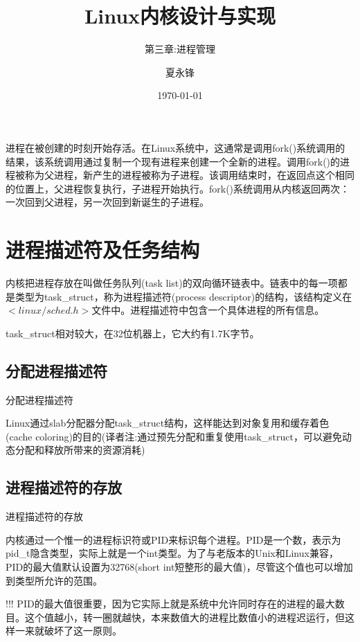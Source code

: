 \documentclass[10pt,compress,mathserif,red]{beamer}
\begin{document}
\begin{CJK*}{UTF8}{gkai}
\title{Linux内核设计与实现}
\subtitle{第三章:进程管理}
\author{夏永锋}
\date{\today}

\begin{frame}
	\titlepage
\end{frame}

\begin{frame}
\begin{block}{}
进程在被创建的时刻开始存活。在Linux系统中，这通常是调用fork()系统调用的结果，该系统调用通过复制一个现有进程来创建一个全新的进程。调用fork()的进程被称为父进程，新产生的进程被称为子进程。该调用结束时，在返回点这个相同的位置上，父进程恢复执行，子进程开始执行。fork()系统调用从内核返回两次：一次回到父进程，另一次回到新诞生的子进程。
\end{block}
\end{frame}

\section{进程描述符及任务结构}
\begin{frame}
\begin{block}{}
内核把进程存放在叫做任务队列(task list)的双向循环链表中。链表中的每一项都是类型为task\_struct，称为进程描述符(process descriptor)的结构，该结构定义在$<linux/sched.h>$文件中。进程描述符中包含一个具体进程的所有信息。
\end{block}
\begin{block}{}
task\_struct相对较大，在32位机器上，它大约有1.7K字节。
\end{block}
\end{frame}
\subsection{分配进程描述符}
\begin{frame}{分配进程描述符}
\begin{block}{}
Linux通过slab分配器分配task\_struct结构，这样能达到对象复用和缓存着色(cache coloring)的目的(译者注:通过预先分配和重复使用task\_struct，可以避免动态分配和释放所带来的资源消耗)
\end{block}
\end{frame}
\subsection{进程描述符的存放}
\begin{frame}{进程描述符的存放}
\begin{block}{}
内核通过一个惟一的进程标识符或PID来标识每个进程。PID是一个数，表示为pid\_t隐含类型，实际上就是一个int类型。为了与老版本的Unix和Linux兼容，PID的最大值默认设置为32768(short int短整形的最大值)，尽管这个值也可以增加到类型所允许的范围。
\end{block}
{\small
\begin{block}{!!!}
PID的最大值很重要，因为它实际上就是系统中允许同时存在的进程的最大数目。这个值越小，转一圈就越快，本来数值大的进程比数值小的进程迟运行，但这样一来就破坏了这一原则。
\end{block}}
\end{frame}

\end{CJK*}
\end{document}
